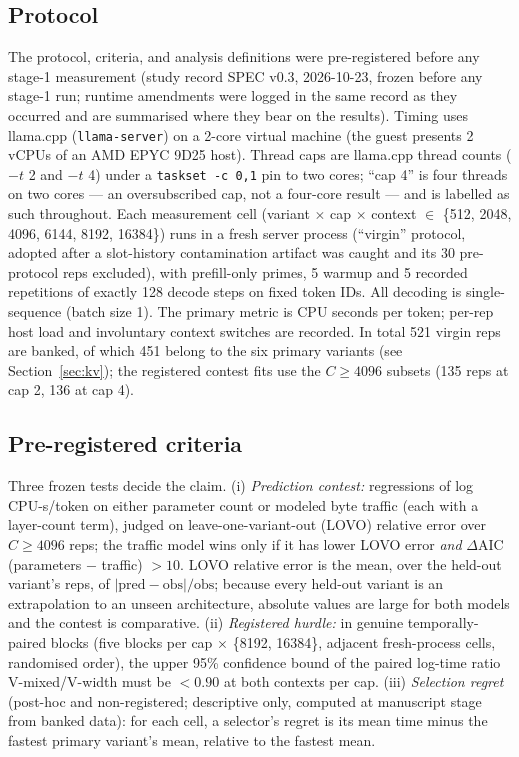 \documentclass[11pt]{article}
\begin{document}
\subsection{Protocol}
The protocol, criteria, and analysis definitions were
pre-registered before any stage-1 measurement (study record
SPEC v0.3, 2026-10-23, frozen before any stage-1 run; runtime
amendments were logged in the same record as they occurred and
are summarised where they bear on the results).
Timing uses llama.cpp (\texttt{llama-server}) on a 2-core virtual
machine (the guest presents 2 vCPUs of an AMD EPYC 9D25 host). Thread caps are llama.cpp thread counts ($-t$ 2 and
$-t$ 4) under a \texttt{taskset -c 0,1} pin to two cores; ``cap 4''
is four threads on two cores --- an oversubscribed cap, not a
four-core result --- and is labelled as such throughout. Each measurement
cell (variant $\times$ cap $\times$ context $\in$
\{512, 2048, 4096, 6144, 8192, 16384\}) runs in a fresh server
process (``virgin'' protocol, adopted after a slot-history
contamination artifact was caught and its 30 pre-protocol reps
excluded), with prefill-only primes, 5 warmup and 5 recorded
repetitions of exactly 128 decode steps on fixed token IDs.
All decoding is single-sequence (batch size 1). The
primary metric is CPU seconds per token; per-rep host load and
involuntary context switches are recorded. In total 521 virgin
reps are banked, of which 451 belong to the six primary variants
(see Section~\ref{sec:kv}); the registered contest fits use the
$C\geq4096$ subsets (135 reps at cap 2, 136 at cap 4).

\subsection{Pre-registered criteria}
Three frozen tests decide the claim. (i) \emph{Prediction contest:}
regressions of log CPU-s/token on either parameter count or
modeled byte traffic (each with a layer-count term), judged on
leave-one-variant-out (LOVO) relative error over $C\geq4096$ reps;
the traffic model wins only if it has lower LOVO error
\emph{and} $\Delta$AIC (parameters $-$ traffic) $> 10$. LOVO
relative error is the mean, over the held-out variant's reps, of
$|\text{pred}-\text{obs}|/\text{obs}$; because every held-out
variant is an extrapolation to an unseen architecture, absolute
values are large for both models and the contest is comparative.
(ii) \emph{Registered hurdle:} in genuine temporally-paired blocks
(five blocks per cap $\times$ \{8192, 16384\}, adjacent
fresh-process cells, randomised order), the upper 95\% confidence
bound of the paired log-time ratio V-mixed/V-width must be
$< 0.90$ at both contexts per cap. (iii) \emph{Selection regret}
(post-hoc and non-registered; descriptive only, computed at
manuscript stage from banked data):
for each cell, a selector's regret is its mean time minus the
fastest primary variant's mean, relative to the fastest mean.
\end{document}
